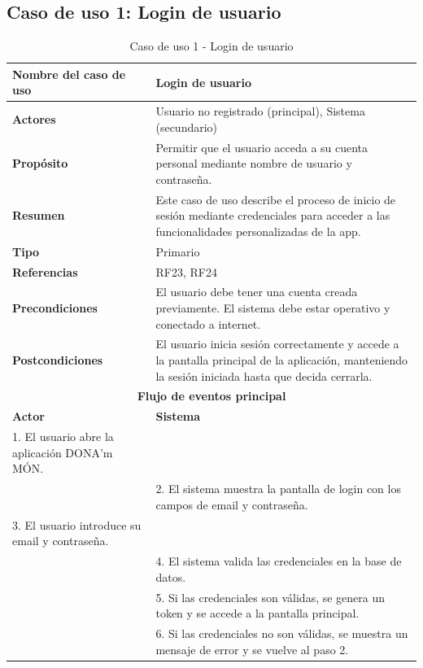 \subsection{Caso de uso 1: Login de usuario}
\captionsetup{skip=0pt}
\begin{table}[H]
\centering
\caption{Caso de uso 1 - Login de usuario}
\begin{tabular}{|p{4.5cm}|p{10.5cm}|}
\hline
\textbf{Nombre del caso de uso} & Login de usuario \\
\hline
\textbf{Actores} & Usuario no registrado (principal), Sistema (secundario) \\
\hline
\textbf{Propósito} & Permitir que el usuario acceda a su cuenta personal mediante nombre de usuario y contraseña. \\
\hline
\textbf{Resumen} & Este caso de uso describe el proceso de inicio de sesión mediante credenciales para acceder a las funcionalidades personalizadas de la app. \\
\hline
\textbf{Tipo} & Primario \\
\hline
\textbf{Referencias} & RF23, RF24 \\
\hline
\textbf{Precondiciones} & El usuario debe tener una cuenta creada previamente. El sistema debe estar operativo y conectado a internet. \\
\hline
\textbf{Postcondiciones} & El usuario inicia sesión correctamente y accede a la pantalla principal de la aplicación, manteniendo la sesión iniciada hasta que decida cerrarla. \\
\hline
\multicolumn{2}{|c|}{\textbf{Flujo de eventos principal}} \\
\hline
\textbf{Actor} & \textbf{Sistema} \\
\hline
1. El usuario abre la aplicación DONA’m MÓN. & \\
\hline
& 2. El sistema muestra la pantalla de login con los campos de email y contraseña. \\
\hline
3. El usuario introduce su email y contraseña. & \\
\hline
& 4. El sistema valida las credenciales en la base de datos. \\
\hline
& 5. Si las credenciales son válidas, se genera un token y se accede a la pantalla principal. \\
\hline
& 6. Si las credenciales no son válidas, se muestra un mensaje de error y se vuelve al paso 2. \\
\hline
\end{tabular}
\end{table}

